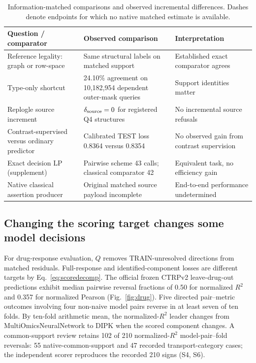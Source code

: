 \documentclass[preprint,11pt,times,number,sort&compress]{elsarticle}
\begin{document}
\begin{table}[t]
\centering\small
\caption{Information-matched comparisons and observed incremental differences. Dashes denote endpoints for which no native matched estimate is available.}
\label{tab:fair}
\begin{tabularx}{\textwidth}{@{}L{0.26\textwidth}L{0.32\textwidth}X@{}}
\toprule
Question / comparator & Observed comparison & Interpretation \\\midrule
Reference legality: graph or row-space & Same structural labels on matched support & Established exact comparator agrees\\
Type-only shortcut & 24.10\% agreement on 10,182,954 dependent outer-mask queries & Support identities matter\\
Replogle source increment & $\delta_{\rm source}=0$ for registered Q4 structures & No incremental source refusals\\
Contrast-supervised versus ordinary predictor & Calibrated TEST loss 0.8364 versus 0.8354 & No observed gain from contrast supervision\\
Exact decision LP (supplement) & Pairwise scheme 43 calls; classical comparator 42 & Equivalent task, no efficiency gain\\
Native classical assertion producer & Original matched source payload incomplete & End-to-end performance undetermined\\
\bottomrule
\end{tabularx}
\end{table}

\subsection{Changing the scoring target changes some model decisions}
For drug-response evaluation, $Q$ removes TRAIN-unresolved directions from matched residuals. Full-response and identified-component losses are different targets by Eq.~\ref{eq:scoredecomp}. The official frozen CTRPv2 leave-drug-out predictions exhibit median pairwise reversal fractions of 0.50 for normalized $R^2$ and 0.357 for normalized Pearson (Fig.~\ref{fig:drug}). Five directed pair--metric outcomes involving four non-naive model pairs reverse in at least seven of ten folds. By ten-fold arithmetic mean, the normalized-$R^2$ leader changes from MultiOmicsNeuralNetwork to DIPK when the scored component changes. A common-support review retains 102 of 210 normalized-$R^2$ model-pair--fold reversals: 55 native-common-support and 47 recorded transport-category cases; the independent scorer reproduces the recorded 210 signs (S4, S6).
\end{document}
